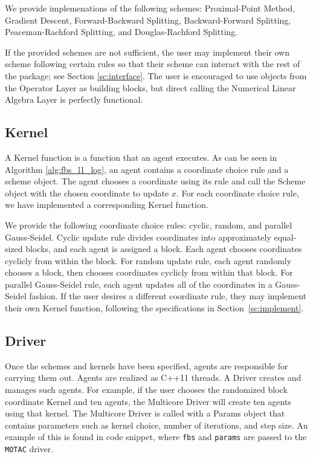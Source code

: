 We provide implemenations of the following schemes:  Proximal-Point Method,  Gradient Descent, Forward-Backward Splitting, Backward-Forward Splitting, Peaceman-Rachford Splitting, and Douglas-Rachford Splitting.

If the provided schemes are not sufficient, the user may implement their own scheme following certain rules so that their scheme can interact with the rest of the package; see Section \ref{sc:interface}.
The user is encouraged to use objects from the Operator Layer as building blocks, but direct calling the Numerical Linear Algebra Layer is perfectly functional. %

\subsection{Kernel}
A Kernel function is a function that an agent executes.
As can be seen in Algorithm \ref{alg:fbs_l1_log}, an agent contains a coordinate choice rule and a scheme object.
The agent chooses a coordinate using its rule and call the Scheme object with the chosen coordinate to update $x$.
For each coordinate choice rule, we have implemented a corresponding Kernel function.

We provide the following coordinate choice rules: cyclic, random, and parallel Gauss-Seidel. 
Cyclic update rule divides coordinates into approximately equal-sized blocks, and each agent is assigned a block.
Each agent chooses coordinates cyclicly from within the block. 
For random update rule, each agent randomly chooses a block, then chooses coordinates cyclicly from within that block.
For parallel Gauss-Seidel rule, each agent updates all of the coordinates in a Gauss-Seidel fashion. 
If the user desires a different coordinate rule, they may implement their own Kernel function, following the specifications in Section~\ref{sc:implement}.


\subsection{Driver}

Once the schemes and kernels have been specified, agents are responsible for carrying them out. Agents are realized as C++11 threads.
A Driver creates and manages such agents.
For example, if the user chooses the randomized block coordinate Kernel and ten agents, the Multicore Driver will create ten agents using that kernel. %
The Multicore Driver is called with a Params object that contains parameters such as kernel choice, number of iterations, and step size.
An example of this is found in code snippet, where \texttt{fbs} and \texttt{params} are passed to the \texttt{MOTAC} driver.

